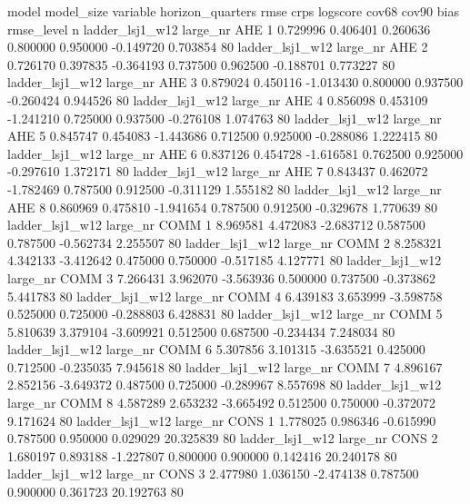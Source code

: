               model model_size variable  horizon_quarters      rmse      crps   logscore    cov68    cov90      bias  rmse_level  n
    ladder_lsj1_w12   large_nr      AHE                 1  0.729996  0.406401   0.260636 0.800000 0.950000 -0.149720    0.703854 80
    ladder_lsj1_w12   large_nr      AHE                 2  0.726170  0.397835  -0.364193 0.737500 0.962500 -0.188701    0.773227 80
    ladder_lsj1_w12   large_nr      AHE                 3  0.879024  0.450116  -1.013430 0.800000 0.937500 -0.260424    0.944526 80
    ladder_lsj1_w12   large_nr      AHE                 4  0.856098  0.453109  -1.241210 0.725000 0.937500 -0.276108    1.074763 80
    ladder_lsj1_w12   large_nr      AHE                 5  0.845747  0.454083  -1.443686 0.712500 0.925000 -0.288086    1.222415 80
    ladder_lsj1_w12   large_nr      AHE                 6  0.837126  0.454728  -1.616581 0.762500 0.925000 -0.297610    1.372171 80
    ladder_lsj1_w12   large_nr      AHE                 7  0.843437  0.462072  -1.782469 0.787500 0.912500 -0.311129    1.555182 80
    ladder_lsj1_w12   large_nr      AHE                 8  0.860969  0.475810  -1.941654 0.787500 0.912500 -0.329678    1.770639 80
    ladder_lsj1_w12   large_nr     COMM                 1  8.969581  4.472083  -2.683712 0.587500 0.787500 -0.562734    2.255507 80
    ladder_lsj1_w12   large_nr     COMM                 2  8.258321  4.342133  -3.412642 0.475000 0.750000 -0.517185    4.127771 80
    ladder_lsj1_w12   large_nr     COMM                 3  7.266431  3.962070  -3.563936 0.500000 0.737500 -0.373862    5.441783 80
    ladder_lsj1_w12   large_nr     COMM                 4  6.439183  3.653999  -3.598758 0.525000 0.725000 -0.288803    6.428831 80
    ladder_lsj1_w12   large_nr     COMM                 5  5.810639  3.379104  -3.609921 0.512500 0.687500 -0.234434    7.248034 80
    ladder_lsj1_w12   large_nr     COMM                 6  5.307856  3.101315  -3.635521 0.425000 0.712500 -0.235035    7.945618 80
    ladder_lsj1_w12   large_nr     COMM                 7  4.896167  2.852156  -3.649372 0.487500 0.725000 -0.289967    8.557698 80
    ladder_lsj1_w12   large_nr     COMM                 8  4.587289  2.653232  -3.665492 0.512500 0.750000 -0.372072    9.171624 80
    ladder_lsj1_w12   large_nr     CONS                 1  1.778025  0.986346  -0.615990 0.787500 0.950000  0.029029   20.325839 80
    ladder_lsj1_w12   large_nr     CONS                 2  1.680197  0.893188  -1.227807 0.800000 0.900000  0.142416   20.240178 80
    ladder_lsj1_w12   large_nr     CONS                 3  2.477980  1.036150  -2.474138 0.787500 0.900000  0.361723   20.192763 80
